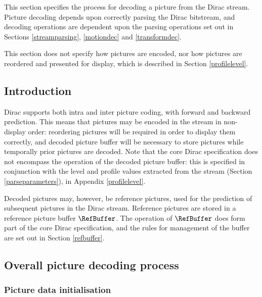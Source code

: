 
\label{picturedec}

This section specifies the process for decoding a picture from the Dirac stream. Picture decoding depends upon
correctly parsing the Dirac bitstream, and decoding operations are dependent upon the parsing operations
set out in Sections \ref{streamparsing}, \ref{motiondec} and \ref{transformdec}.

This section does not specify how pictures are encoded, nor how pictures are reordered and presented for display, 
which is described in Section \ref{profilelevel}. 

\subsection{Introduction}

Dirac supports both intra and inter picture coding, with forward and backward prediction. This means that
pictures may be encoded in the stream in non-display order: reordering pictures will be required in order
to display them correctly, and  decoded picture buffer will be necessary to store pictures while temporally 
prior pictures are decoded. Note that the core Dirac specification does not encompass the operation of the
decoded picture buffer: this is specified in conjunction with the level and profile values extracted from
the stream (Section \ref{parseparameters}), in Appendix \ref{profilelevel}. 

Decoded pictures may, however, be reference pictures, used for the prediction of subsequent pictures
in the Dirac stream. Reference pictures are stored in a reference picture buffer $\RefBuffer$. The operation
of $\RefBuffer$ does form part of the core Dirac specification, and the rules for management of the
buffer are set out in Section \ref{refbuffer}.

\subsection{Overall picture decoding process}
\label{overallpicturedec}

\subsubsection{Picture data initialisation}
\label{picdataconventions}

